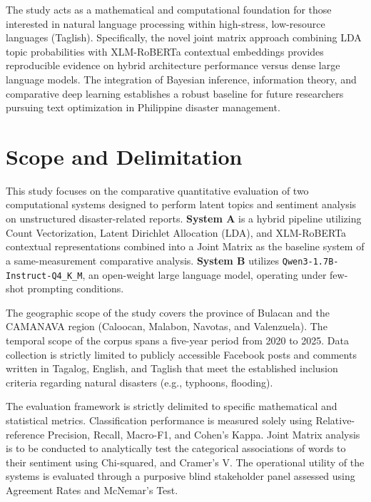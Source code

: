 \documentclass[12pt,a4paper]{report}
\newcommand{\sysA}{\textbf{System A}}
\newcommand{\sysB}{\textbf{System B}}
\newcommand{\qwen}{\texttt{Qwen3-1.7B-Instruct-Q4\_K\_M}}
\newcommand{\xlmr}{XLM-RoBERTa}
\begin{document}
\begin{description}[style=sameline,leftmargin=0pt]
  \item[Researchers and Future Developers.] The study acts as a mathematical
  and computational foundation for those interested in natural language
  processing within high-stress, low-resource languages (Taglish).
  Specifically, the novel joint matrix approach combining LDA topic
  probabilities with \xlmr{} contextual embeddings provides reproducible
  evidence on hybrid architecture performance versus dense large language
  models. The integration of Bayesian inference, information theory, and
  comparative deep learning establishes a robust baseline for future researchers
  pursuing text optimization in Philippine disaster management.
\end{description}

\section{Scope and Delimitation}

This study focuses on the comparative quantitative evaluation of two
computational systems designed to perform latent topics and sentiment analysis on
unstructured disaster-related reports. \sysA{} is a hybrid pipeline utilizing
Count Vectorization, Latent Dirichlet Allocation (LDA), and \xlmr{}
contextual representations combined into a Joint Matrix as the baseline system
of a same-measurement comparative analysis. \sysB{} utilizes \qwen, an
open-weight large language model, operating under few-shot prompting
conditions.

The geographic scope of the study covers the province of Bulacan and the
CAMANAVA region (Caloocan, Malabon, Navotas, and Valenzuela). The temporal
scope of the corpus spans a five-year period from 2020 to 2025. Data collection
is strictly limited to publicly accessible Facebook posts and comments written
in Tagalog, English, and Taglish that meet the established inclusion criteria
regarding natural disasters (e.g., typhoons, flooding).

The evaluation framework is strictly delimited to specific mathematical and
statistical metrics. Classification performance is measured solely using Relative-reference
Precision, Recall, Macro-F1, and Cohen's Kappa. Joint Matrix analysis is to be
conducted to analytically test the categorical associations of words to their
sentiment using Chi-squared, and Cramer's V. The operational
utility of the systems is evaluated through a purposive blind stakeholder panel
assessed using Agreement Rates and McNemar's Test.
\end{document}
